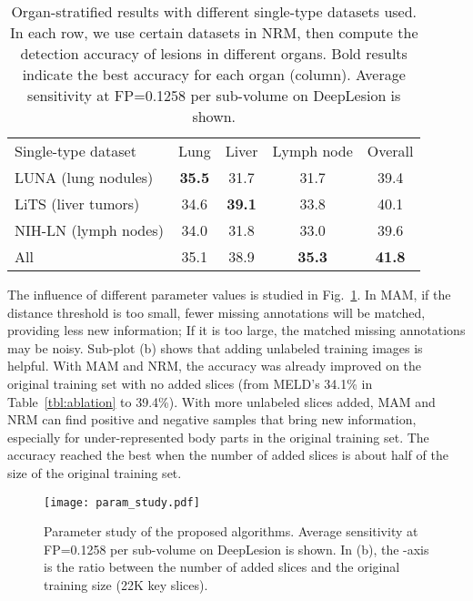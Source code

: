 \documentclass[runningheads]{llncs}
\def\Fig#1{{Fig.~\ref{fig:#1}}}
\def\Table#1{{Table~\ref{tbl:#1}}}
\begin{document}
\begin{table}[t]
	\begin{center}
\setlength{\tabcolsep}{4pt}
\caption{Organ-stratified results with different single-type datasets used. In each row, we use certain datasets in NRM, then compute the detection accuracy of lesions in different organs. Bold results indicate the best accuracy for each organ (column). Average sensitivity at FP=0.1258 per sub-volume on DeepLesion is shown.}
		\label{tbl:NRM_organ}
		\begin{tabular}{lcccc}
			\hline\noalign{\smallskip}
			Single-type dataset	& Lung	& Liver	& Lymph node & Overall	 \\ \noalign{\smallskip}\hline\noalign{\smallskip}
			LUNA (lung nodules)	& \bf 35.5	& 31.7	& 31.7	& 39.4	\\
			LiTS (liver tumors)	& 34.6	& \bf 39.1	& 33.8	& 40.1	\\
			NIH-LN (lymph nodes)	& 34.0	& 31.8	& 33.0	& 39.6	\\
			All		& 35.1	& 38.9	& \bf 35.3	& \bf 41.8	\\
			\hline
		\end{tabular} \vspace{-3mm}
	\end{center}
\end{table}

The influence of different parameter values is studied in \Fig{param_study}. In MAM, if the distance threshold  is too small, fewer missing annotations will be matched, providing less new information; If it is too large, the matched missing annotations may be noisy. Sub-plot (b) shows that adding unlabeled training images is helpful. With MAM and NRM, the accuracy was already improved on the original training set with no added slices (from MELD's 34.1\% in \Table{ablation} to 39.4\%). With more unlabeled slices added, MAM and NRM can find positive and negative samples that bring new information, especially for under-represented body parts in the original training set. The accuracy reached the best when the number of added slices is about half of the size of the original training set.

\begin{figure}[]
	\centering
	\texttt{[image: param\_study.pdf]} \caption{Parameter study of the proposed algorithms. Average sensitivity at FP=0.1258 per sub-volume on DeepLesion is shown. In (b), the -axis is the ratio between the number of added slices and the original training size (22K key slices).}
	\label{fig:param_study}\end{figure}
\end{document}
